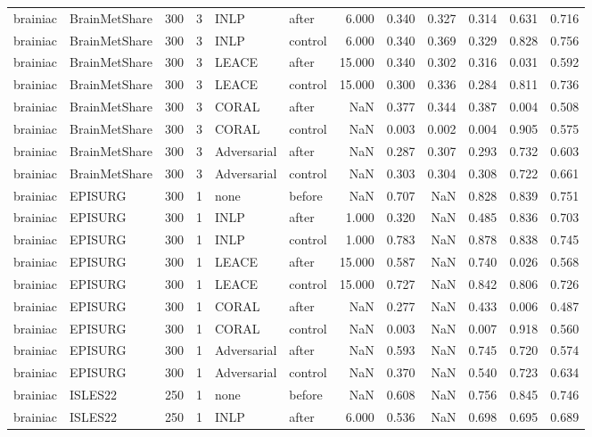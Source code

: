 \begin{tabular}{llrrllrrrrrr}
brainiac & BrainMetShare & 300 & 3 & INLP & after & 6.000 & 0.340 & 0.327 & 0.314 & 0.631 & 0.716 \\
brainiac & BrainMetShare & 300 & 3 & INLP & control & 6.000 & 0.340 & 0.369 & 0.329 & 0.828 & 0.756 \\
brainiac & BrainMetShare & 300 & 3 & LEACE & after & 15.000 & 0.340 & 0.302 & 0.316 & 0.031 & 0.592 \\
brainiac & BrainMetShare & 300 & 3 & LEACE & control & 15.000 & 0.300 & 0.336 & 0.284 & 0.811 & 0.736 \\
brainiac & BrainMetShare & 300 & 3 & CORAL & after & NaN & 0.377 & 0.344 & 0.387 & 0.004 & 0.508 \\
brainiac & BrainMetShare & 300 & 3 & CORAL & control & NaN & 0.003 & 0.002 & 0.004 & 0.905 & 0.575 \\
brainiac & BrainMetShare & 300 & 3 & Adversarial & after & NaN & 0.287 & 0.307 & 0.293 & 0.732 & 0.603 \\
brainiac & BrainMetShare & 300 & 3 & Adversarial & control & NaN & 0.303 & 0.304 & 0.308 & 0.722 & 0.661 \\
brainiac & EPISURG & 300 & 1 & none & before & NaN & 0.707 & NaN & 0.828 & 0.839 & 0.751 \\
brainiac & EPISURG & 300 & 1 & INLP & after & 1.000 & 0.320 & NaN & 0.485 & 0.836 & 0.703 \\
brainiac & EPISURG & 300 & 1 & INLP & control & 1.000 & 0.783 & NaN & 0.878 & 0.838 & 0.745 \\
brainiac & EPISURG & 300 & 1 & LEACE & after & 15.000 & 0.587 & NaN & 0.740 & 0.026 & 0.568 \\
brainiac & EPISURG & 300 & 1 & LEACE & control & 15.000 & 0.727 & NaN & 0.842 & 0.806 & 0.726 \\
brainiac & EPISURG & 300 & 1 & CORAL & after & NaN & 0.277 & NaN & 0.433 & 0.006 & 0.487 \\
brainiac & EPISURG & 300 & 1 & CORAL & control & NaN & 0.003 & NaN & 0.007 & 0.918 & 0.560 \\
brainiac & EPISURG & 300 & 1 & Adversarial & after & NaN & 0.593 & NaN & 0.745 & 0.720 & 0.574 \\
brainiac & EPISURG & 300 & 1 & Adversarial & control & NaN & 0.370 & NaN & 0.540 & 0.723 & 0.634 \\
brainiac & ISLES22 & 250 & 1 & none & before & NaN & 0.608 & NaN & 0.756 & 0.845 & 0.746 \\
brainiac & ISLES22 & 250 & 1 & INLP & after & 6.000 & 0.536 & NaN & 0.698 & 0.695 & 0.689 \\

\end{tabular}
